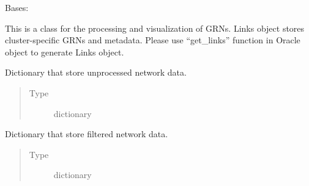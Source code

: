 \documentclass[letterpaper,10pt,english]{sphinxmanual}
\begin{document}
\begin{fulllineitems}
\begin{fulllineitems}
\begin{quote}
\begin{description}
\end{description}\end{quote}

\end{fulllineitems}


\end{fulllineitems}


\begin{fulllineitems}
\label{\detokenize{modules/celloracle:celloracle.Links}}
Bases: 

This is a class for the processing and visualization of GRNs.
Links object stores cluster-specific GRNs and metadata.
Please use “get\_links” function in Oracle object to generate Links object.

\begin{fulllineitems}
\label{\detokenize{modules/celloracle:celloracle.Links.links_dict}}
Dictionary that store unprocessed network data.
\begin{quote}\begin{description}
\item[{Type}] \leavevmode
dictionary

\end{description}\end{quote}

\end{fulllineitems}


\begin{fulllineitems}
\label{\detokenize{modules/celloracle:celloracle.Links.filtered_links}}
Dictionary that store filtered network data.
\begin{quote}\begin{description}
\item[{Type}] \leavevmode
dictionary

\end{description}\end{quote}


\end{fulllineitems}
\end{fulllineitems}
\end{document}
